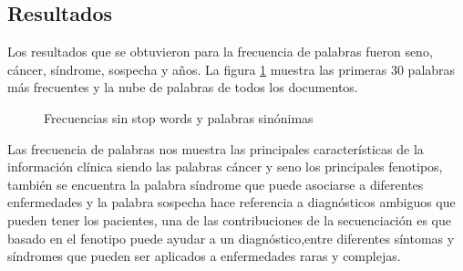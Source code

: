 \subsection*{Resultados}

Los resultados que se obtuvieron para la frecuencia de palabras fueron seno, cáncer, síndrome, sospecha y años. La figura \ref{fig:sin} muestra las primeras 30 palabras más frecuentes y la nube de palabras de todos los documentos.\\

\begin{figure}[]
	\centering
	\caption{Frecuencias sin stop words y palabras sinónimas} \label{fig:sin}
\end{figure} 

Las frecuencia de palabras nos muestra las principales características de la información clínica siendo las palabras cáncer y seno los principales fenotipos, también se encuentra la palabra síndrome que puede asociarse a diferentes  enfermedades y la palabra sospecha hace referencia a diagnósticos ambiguos que pueden tener los pacientes, una de las contribuciones de la secuenciación es que basado en el fenotipo puede ayudar a un diagnóstico,entre diferentes síntomas y síndromes que pueden ser aplicados a enfermedades raras y complejas\cite{Tetreault2015a}. \\

